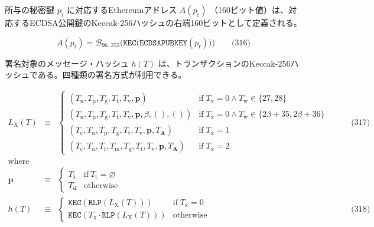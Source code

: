 \documentclass[
]{ltjsarticle}
\begin{document}
所与の秘密鍵 \(p_{\mathrm{r}}\) に対応するEthereumアドレス
\(A(p_{\mathrm{r}})\)
（160ビット値）は、対応するECDSA公開鍵のKeccak-256ハッシュの右端160ビットとして定義される。

\protect\hypertarget{eq-316}{}{}

\[A(p_{\mathrm{r}}) = \mathcal{B}_{96..255}\big(\mathtt{KEC}\big( \mathtt{ECDSAPUBKEY}(p_{\mathrm{r}}) \big) \big) \qquad \text{(316)}\]

\hypertarget{h_of_T}{}

署名対象のメッセージ・ハッシュ \(h(T)\)
は、トランザクションのKeccak-256ハッシュである。四種類の署名方式が利用できる。

\protect\hypertarget{eq-317}{}{}\protect\hypertarget{eq-318}{}{}

\[\begin{aligned}
L_{\mathrm{X}}(T) & \equiv & \begin{cases}
(T_{\mathrm{n}}, T_{\mathrm{p}}, T_{\mathrm{g}}, T_{\mathrm{t}}, T_{\mathrm{v}}, \mathbf{p}) & \text{if} \; T_{\mathrm{x}} = 0 \land T_{\mathrm{w}} \in \{27, 28\} \\
(T_{\mathrm{n}}, T_{\mathrm{p}}, T_{\mathrm{g}}, T_{\mathrm{t}}, T_{\mathrm{v}}, \mathbf{p}, \beta, (), ()) & \text{if} \; T_{\mathrm{x}} = 0 \land T_{\mathrm{w}} \in \{2\beta + 35, 2\beta + 36\} \\
(T_{\mathrm{c}}, T_{\mathrm{n}}, T_{\mathrm{p}}, T_{\mathrm{g}}, T_{\mathrm{t}}, T_{\mathrm{v}}, \mathbf{p}, T_{\mathbf{A}}) & \text{if} \; T_{\mathrm{x}} = 1 \\
(T_{\mathrm{c}}, T_{\mathrm{n}}, T_{\mathrm{f}}, T_{\mathrm{m}},  T_{\mathrm{g}}, T_{\mathrm{t}}, T_{\mathrm{v}}, \mathbf{p}, T_{\mathbf{A}}) & \text{if} \; T_{\mathrm{x}} = 2
\end{cases} & \qquad \text{(317)} \\
\text{where} \\
\mathbf{p} & \equiv & \begin{cases}
T_{\mathbf{i}} & \text{if}\ T_{\mathrm{t}} = \varnothing \\
T_{\mathbf{d}} & \text{otherwise}
\end{cases} \\
h(T) & \equiv & \begin{cases}
\mathtt{KEC}( \mathtt{RLP}(L_{\mathrm{X}}(T)) ) & \text{if} \; T_{\mathrm{x}} = 0 \\
\mathtt{KEC}( T_{\mathrm{x}} \cdot \mathtt{RLP}(L_{\mathrm{X}}(T)) ) & \text{otherwise}
\end{cases} & \qquad \text{(318)}
\end{aligned}\]
\end{document}
